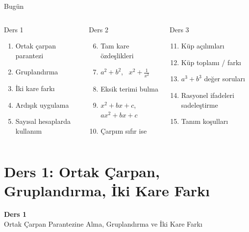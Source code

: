 \documentclass[aspectratio=169,11pt]{beamer}
\begin{document}
\begin{frame}{Bugün}
\begin{columns}[t]
\begin{block}{Ders 1}
\begin{enumerate}
\item Ortak çarpan parantezi
\item Gruplandırma
\item İki kare farkı
\item Ardışık uygulama
\item Sayısal hesaplarda kullanım
\end{enumerate}
\end{block}
\begin{block}{Ders 2}
\begin{enumerate}\setcounter{enumi}{5}
\item Tam kare özdeşlikleri
\item \(a^2+b^2\), \ \(x^2+\frac{1}{x^2}\)
\item Eksik terimi bulma
\item \(x^2+bx+c\), \ \(ax^2+bx+c\)
\item Çarpım sıfır ise
\end{enumerate}
\end{block}
\begin{block}{Ders 3}
\begin{enumerate}\setcounter{enumi}{10}
\item Küp açılımları
\item Küp toplamı / farkı
\item \(a^3+b^3\) değer soruları
\item Rasyonel ifadeleri sadeleştirme
\item Tanım koşulları
\end{enumerate}
\end{block}
\end{columns}
\end{frame}

\section{Ders 1: Ortak Çarpan, Gruplandırma, İki Kare Farkı}
\begin{frame}
\centering\Large\color{anamavi}\textbf{Ders 1}\\[6pt]\normalsize Ortak Çarpan Parantezine Alma, Gruplandırma ve İki Kare Farkı
\end{frame}
\end{document}
